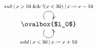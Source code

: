$\xymatrix{
   \ovalbox{$l_0$} \ar@(ul,ur)[]^{sub\,|\,x\,>\,10\:\&\&\:!(x\,<\,30)\,|\,x\,:=\,x\,-\,10} \ar@(dl,dr)[]_{add\,|\,x\,<\,30\,|\,x\,:=\,x\,+\,10}
}$
